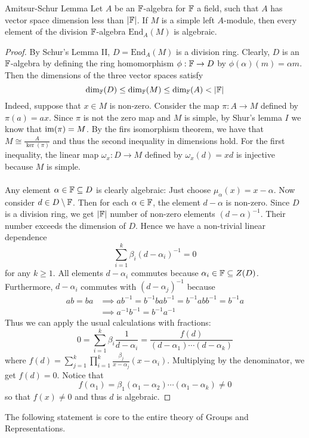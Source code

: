 \documentclass[a4paper]{article}
\begin{document}
\begin{thm}{Amitsur-Schur Lemma}{} Let $A$ be an $\mathbb{F}$-algebra for $\mathbb{F}$ a field, such that $A$ has vector space dimension less than $\abs{\mathbb{F}}$. If $M$ is a simple left $A$-module, then every element of the division $\mathbb{F}$-algebra $\text{End}_A(M)$ is algebraic. \tcbline
\begin{proof}
By Schur's Lemma II, $D=\text{End}_A(M)$ is a division ring. Clearly, $D$ is an $\mathbb{F}$-algebra by defining the ring homomorphism $\phi:\mathbb{F}\to D$ by $\phi(\alpha)(m)=\alpha m$. Then the dimensions of the three vector spaces satisfy $$\dim_{\mathbb{F}}(D)\leq\dim_{\mathbb{F}}(M)\leq\dim_{\mathbb{F}}(A)<\abs{\mathbb{F}}$$ Indeed, suppose that $x\in M$ is non-zero. Consider the map $\pi:A\to M$ defined by $\pi(a)=ax$. Since $\pi$ is not the zero map and $M$ is simple, by Shur's lemma $I$ we know that $\operatorname{im}(\pi)=M$. By the firs isomorphism theorem, we have that $M\cong\frac{A}{\ker(\pi)}$ and thus the second inequality in dimensions hold. For the first inequality, the linear map $\omega_x:D\to M$ defined by $\omega_x(d)=xd$ is injective because $M$ is simple. \\~\\

Any element $\alpha\in\mathbb{F}\subseteq D$ is clearly algebraic: Just choose $\mu_\alpha(x)=x-\alpha$. Now consider $d\in D\setminus\mathbb{F}$. Then for each $\alpha\in\mathbb{F}$, the element $d-\alpha$ is non-zero. Since $D$ is a division ring, we get $\abs{\mathbb{F}}$ number of non-zero elements $(d-\alpha)^{-1}$. Their number exceeds the dimension of $D$. Hence we have a non-trivial linear dependence $$\sum_{i=1}^k\beta_i(d-\alpha_i)^{-1}=0$$ for any $k\geq 1$. All elements $d-\alpha_i$ commutes because $\alpha_i\in\mathbb{F}\subseteq Z(D)$. Furthermore, $d-\alpha_i$ commutes with $(d-\alpha_j)^{-1}$ because 
\begin{align*}
ab=ba&\implies ab^{-1}=b^{-1}bab^{-1}=b^{-1}abb^{-1}=b^{-1}a\\
&\implies a^{-1}b^{-1}=b^{-1}a^{-1}
\end{align*}
Thus we can apply the usual calculations with fractions: $$0=\sum_{i=1}^k\beta_i\frac{1}{d-\alpha_i}=\frac{f(d)}{(d-\alpha_1)\cdots(d-\alpha_k)}$$ where $f(d)=\sum_{j=1}^k\prod_{i=1}^k\frac{\beta_j}{x-\alpha_j}(x-\alpha_i)$. Multiplying by the denominator, we get $f(d)=0$. Notice that $$f(\alpha_1)=\beta_1(\alpha_1-\alpha_2)\cdots(\alpha_1-\alpha_k)\neq 0$$ so that $f(x)\neq 0$ and thus $d$ is algebraic. 
\end{proof}
\end{thm}

The following statement is core to the entire theory of Groups and Representations. 
\end{document}
